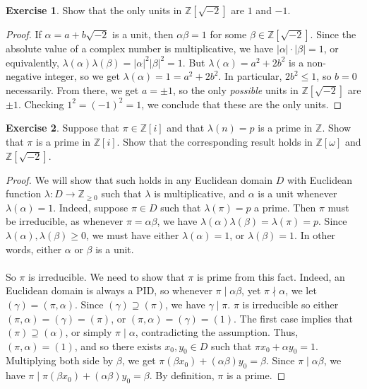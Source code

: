 \documentclass{article}
\theoremstyle{definition}
\newtheorem{exercise}{Exercise}
\begin{document}
\begin{exercise}
Show that the only units in $\mathbb{Z}[\sqrt{-2}]$ are $1$ and $-1$.
\end{exercise}
\begin{proof}
If $\alpha = a + b \sqrt{-2}$ is a unit, then $\alpha \beta = 1$ for some $\beta \in \mathbb{Z}[\sqrt{-2}]$. Since the absolute value of a complex number is multiplicative, we have $|\alpha| \cdot |\beta| = 1$, or equivalently, $\lambda(\alpha) \lambda(\beta) = |\alpha|^2 |\beta|^2 = 1$. But $\lambda(\alpha) = a^2 + 2b^2$ is a non-negative integer, so we get $\lambda(\alpha) = 1 = a^2 + 2b^2$. In particular, $2b^2 \leq 1$, so $b = 0$ necessarily. From there, we get $a = \pm 1$, so the only \textit{possible} units in $\mathbb{Z}[\sqrt{-2}]$ are $\pm 1$. Checking $1^2 = (-1)^2 = 1$, we conclude that these are the only units.
\end{proof}

\newpage

\begin{exercise}
Suppose that $\pi \in \mathbb{Z}[i]$ and that $\lambda(n) = p$ is a prime in $\mathbb{Z}$. Show that $\pi$ is a prime in $\mathbb{Z}[i]$. Show that the corresponding result holds in $\mathbb{Z}[\omega]$ and $\mathbb{Z}[\sqrt{-2}]$.
\end{exercise}
\begin{proof}
We will show that such holds in any Euclidean domain $D$ with Euclidean function $\lambda: D \to \mathbb{Z}_{\geq 0}$ such that $\lambda$ is multiplicative, and $\alpha$ is a unit whenever $\lambda(\alpha) = 1$. Indeed, suppose $\pi \in D$ such that $\lambda(\pi) = p$ a prime. Then $\pi$ must be irreducible, as whenever $\pi = \alpha \beta$, we have $\lambda(\alpha) \lambda(\beta) = \lambda(\pi) = p$. Since $\lambda(\alpha), \lambda(\beta) \geq 0$, we must have either $\lambda(\alpha) = 1$, or $\lambda(\beta) = 1$. In other words, either $\alpha$ or $\beta$ is a unit.
\\
\\
So $\pi$ is irreducible. We need to show that $\pi$ is prime from this fact. Indeed, an Euclidean domain is always a PID, so whenever $\pi \mid \alpha \beta$, yet $\pi \nmid \alpha$, we let $(\gamma) = (\pi, \alpha)$. Since $(\gamma) \supseteq (\pi)$, we have $\gamma \mid \pi$. $\pi$ is irreducible so either $(\pi, \alpha) = (\gamma) = (\pi)$, or $(\pi, \alpha) = (\gamma) = (1)$. The first case implies that $(\pi) \supseteq (\alpha)$, or simply $\pi \mid \alpha$, contradicting the assumption. Thus, $(\pi, \alpha) = (1)$, and so there exists $x_0, y_0 \in D$ such that $\pi x_0 + \alpha y_0 = 1$. Multiplying both side by $\beta$, we get $\pi (\beta x_0) + (\alpha \beta) y_0 = \beta$. Since $\pi \mid \alpha \beta$, we have $\pi \mid \pi (\beta x_0) + (\alpha \beta) y_0 = \beta$. By definition, $\pi$ is a prime.
\end{proof}
\end{document}
